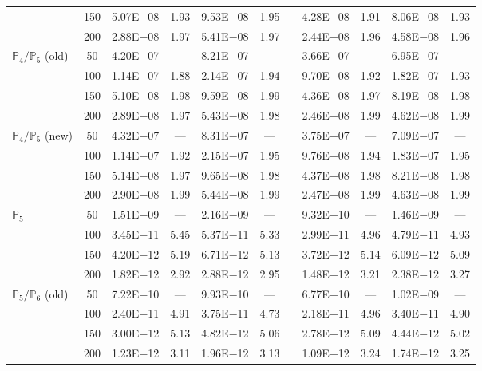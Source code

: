 \begin{table}[H]
{\begin{tabular}{@{}l c c c c c c c c c c@{}}
 & 150 & 5.07E$-$08 & 1.93  & 9.53E$-$08 & 1.95 &  & 4.28E$-$08 & 1.91 & 8.06E$-$08 & 1.93\\
 & 200 & 2.88E$-$08 & 1.97  & 5.41E$-$08 & 1.97 &  & 2.44E$-$08 & 1.96 & 4.58E$-$08 & 1.96\\
\midrule
\multirow{4}{*}{$\mathbb{P}_{4}/\mathbb{P}_{5}$ (old)}
 & 50 & 4.20E$-$07 & ---  & 8.21E$-$07 & --- &  & 3.66E$-$07 & --- & 6.95E$-$07 & ---\\
 & 100 & 1.14E$-$07 & 1.88  & 2.14E$-$07 & 1.94 &  & 9.70E$-$08 & 1.92 & 1.82E$-$07 & 1.93\\
 & 150 & 5.10E$-$08 & 1.98  & 9.59E$-$08 & 1.99 &  & 4.36E$-$08 & 1.97 & 8.19E$-$08 & 1.98\\
 & 200 & 2.89E$-$08 & 1.97  & 5.43E$-$08 & 1.98 &  & 2.46E$-$08 & 1.99 & 4.62E$-$08 & 1.99\\
\midrule
\multirow{4}{*}{$\mathbb{P}_{4}/\mathbb{P}_{5}$ (new)}
 & 50 & 4.32E$-$07 & ---  & 8.31E$-$07 & --- &  & 3.75E$-$07 & --- & 7.09E$-$07 & ---\\
 & 100 & 1.14E$-$07 & 1.92  & 2.15E$-$07 & 1.95 &  & 9.76E$-$08 & 1.94 & 1.83E$-$07 & 1.95\\
 & 150 & 5.14E$-$08 & 1.97  & 9.65E$-$08 & 1.98 &  & 4.37E$-$08 & 1.98 & 8.21E$-$08 & 1.98\\
 & 200 & 2.90E$-$08 & 1.99  & 5.44E$-$08 & 1.99 &  & 2.47E$-$08 & 1.99 & 4.63E$-$08 & 1.99\\
\midrule
\multirow{4}{*}{$\mathbb{P}_{5}$}
 & 50 & 1.51E$-$09 & ---  & 2.16E$-$09 & --- &  & 9.32E$-$10 & --- & 1.46E$-$09 & ---\\
 & 100 & 3.45E$-$11 & 5.45  & 5.37E$-$11 & 5.33 &  & 2.99E$-$11 & 4.96 & 4.79E$-$11 & 4.93\\
 & 150 & 4.20E$-$12 & 5.19  & 6.71E$-$12 & 5.13 &  & 3.72E$-$12 & 5.14 & 6.09E$-$12 & 5.09\\
 & 200 & 1.82E$-$12 & 2.92  & 2.88E$-$12 & 2.95 &  & 1.48E$-$12 & 3.21 & 2.38E$-$12 & 3.27\\
\midrule
\multirow{4}{*}{$\mathbb{P}_{5}/\mathbb{P}_{6}$ (old)}
 & 50 & 7.22E$-$10 & ---  & 9.93E$-$10 & --- &  & 6.77E$-$10 & --- & 1.02E$-$09 & ---\\
 & 100 & 2.40E$-$11 & 4.91  & 3.75E$-$11 & 4.73 &  & 2.18E$-$11 & 4.96 & 3.40E$-$11 & 4.90\\
 & 150 & 3.00E$-$12 & 5.13  & 4.82E$-$12 & 5.06 &  & 2.78E$-$12 & 5.09 & 4.44E$-$12 & 5.02\\
 & 200 & 1.23E$-$12 & 3.11  & 1.96E$-$12 & 3.13 &  & 1.09E$-$12 & 3.24 & 1.74E$-$12 & 3.25\\

\end{tabular}}
\end{table}
